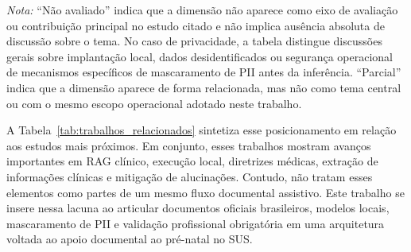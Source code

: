 \begin{table}[tttt]
\begin{tabular}{p{1.8cm} p{3cm} p{3cm} c c c c c}
\bottomrule
\end{tabular}

\vspace{0.1cm}
\begin{minipage}{0.98\textwidth}
\scriptsize
\textit{Nota:} ``Não avaliado'' indica que a dimensão não aparece como eixo de avaliação ou contribuição principal no estudo citado e não implica ausência absoluta de discussão sobre o tema. No caso de privacidade, a tabela distingue discussões gerais sobre implantação local, dados desidentificados ou segurança operacional de mecanismos específicos de mascaramento de PII antes da inferência. ``Parcial'' indica que a dimensão aparece de forma relacionada, mas não como tema central ou com o mesmo escopo operacional adotado neste trabalho.
\end{minipage}
\end{table}

A Tabela~\ref{tab:trabalhos_relacionados} sintetiza esse posicionamento em relação aos estudos mais próximos. Em conjunto, esses trabalhos mostram avanços importantes em RAG clínico, execução local, diretrizes médicas, extração de informações clínicas e mitigação de alucinações. Contudo, não tratam esses elementos como partes de um mesmo fluxo documental assistivo. Este trabalho se insere nessa lacuna ao articular documentos oficiais brasileiros, modelos locais, mascaramento de PII e validação profissional obrigatória em uma arquitetura voltada ao apoio documental ao pré-natal no SUS.



